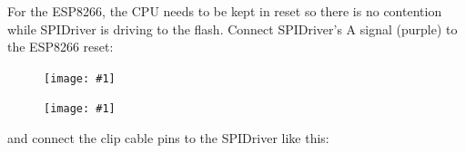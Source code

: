 \documentclass{article}
\newcommand{\png}[1]{
\begin{figure}[H]
\begin{center}
\texttt{[image: \#1]}
\end{center}
\end{figure}
}
\begin{document}
For the ESP8266, the CPU needs to be kept in reset so there is no contention while SPIDriver is driving to the flash.
Connect SPIDriver's A signal (purple) to the ESP8266 reset:
 
\png{img/spidriver/spidriver-esp2}

\png{img/spidriver/spidriver-flash-2}

and connect the clip cable pins to the SPIDriver like this:
 
% 
% 
% 
% 
% 
% 
% 
% 
% 
% 
% 
% 
\end{document}

